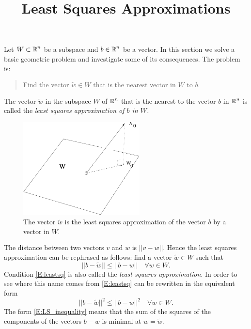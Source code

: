 \documentclass{ximera}
\title{Least Squares Approximations}
\begin{document}
\begin{abstract}
\end{abstract}
\maketitle

  \label{S:LSA}

Let $W\subset\mbox{$\mathbb{R}$}^n$ be a subspace and $b\in\mbox{$\mathbb{R}$}^n$ be a vector.  In this
section we solve a basic geometric problem and investigate some of its
consequences.  The problem is:
\begin{quote}
Find the vector $\tilde{w}\in W$ that is the nearest vector in $W$ to $b$.
\end{quote}

\begin{definition} \rm \label{D:least_squares}
The vector $\tilde{w}$ in the subspace $W$ of $\mbox{$\mathbb{R}$}^n$ that is the nearest to the 
vector $b$ in $\mbox{$\mathbb{R}$}^n$ is called the \em{least squares approximation} of 
$b$ in $W$.
\end{definition} 

\begin{figure}[htb]
        \centerline{%
        \includegraphics[width=2.5in]{../figures/nearest.pdf}}
        \caption{The vector $\tilde{w}$ is the least squares approximation of the vector $b$ by a vector in $W$.}
        \label{F:nearest}
\end{figure}


The distance between two vectors
$v$ and $w$ is $||v-w||$.  Hence the least squares approximation 
can be rephrased as follows: find a vector $\tilde{w}\in W$ such that
\begin{equation}  \label{E:leastsq}
||b-\tilde{w}||\leq ||b-w|| \quad \forall w\in W.
\end{equation}
Condition \eqref{E:leastsq} is also called the
{\em least squares approximation}.
In order to see where this name comes from \eqref{E:leastsq} can be 
rewritten in the equivalent form
\begin{equation} \label{E:LS_inequality}
||b-\tilde{w}||^2\leq ||b-w||^2 \quad \forall w\in W.
\end{equation}
The form \eqref{E:LS_inequality} means that the sum of the squares of the
components of the vectors $b - w$ is minimal at $w = \tilde{w}$.
\end{document}
